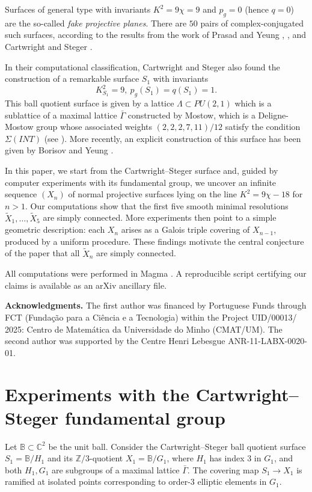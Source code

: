 \documentclass[10pt,a4paper]{article}
\newcommand{\ZZ}{\mathbb{Z}}
\newcommand{\BB}{\mathbb{B}}
\newcommand{\CC}{\mathbb{C}}
\begin{document}
Surfaces of general type with invariants $K^2=9\chi=9$ and $p_g=0$ (hence $q=0$) are the so-called {\em fake projective planes}.
There are $50$ pairs of complex-conjugated such surfaces,
according to the results from the work of Prasad and Yeung \cite{PY1}, \cite{PY2},
and Cartwright and Steger \cite{CS}.

In their computational classification, Cartwright and Steger \cite{CS} also found the construction of a remarkable surface
$S_1$ with invariants
\[K_{S_1}^2=9,\ p_{g}(S_1)=q(S_1)=1.\]
%
This ball quotient surface is given by a lattice $\Lambda\subset PU(2,1)$ which is a sublattice of a maximal lattice
$\bar{\Gamma}$ constructed by Mostow, which is a Deligne-Mostow group whose associated
weights $(2,2,2,7,11)/12$ satisfy the condition $\Sigma(INT)$ (see \cite{Mostow}).
%
More recently, an explicit construction of this surface has been given by Borisov and Yeung \cite{BY}.

In this paper, we start from the Cartwright--Steger surface and,
guided by computer experiments with its fundamental group,
we uncover an infinite sequence $(X_n)$ of normal projective surfaces
lying on the line $K^2 = 9\chi - 18$ for $n > 1$.
Our computations show that the first five smooth minimal resolutions
\(\widetilde{X}_1,\dots,\widetilde{X}_5\) are simply connected. More
experiments then point to a simple geometric description: each
\(X_n\) arises as a Galois triple covering of \(X_{n-1}\), produced by a uniform procedure.
These findings motivate the central conjecture of the paper that all \(\widetilde{X}_n\) are simply
connected.

All computations were performed in Magma \cite{BCP}.
A reproducible script certifying our claims is available as an arXiv ancillary file.





\bigskip 
\noindent\textbf{Acknowledgments.}
The first author was financed by Portuguese Funds through FCT
(Funda\c c\~ao para a Ci\^encia e a Tecnologia) within the Project
UID/00013/ 2025: Centro de Matem\'atica da Universidade do Minho (CMAT/UM).
The second author was supported by the Centre Henri Lebesgue ANR-11-LABX-0020-01.


\section{Experiments with the Cartwright--Steger fundamental group}

Let \(\BB\subset\CC^2\) be the unit ball. Consider the
Cartwright--Steger ball quotient surface \(S_1=\BB/H_1\) and its $\ZZ/3$-quotient
\(X_1=\BB/G_1\), where \(H_1\) has index \(3\) in \(G_1\), and both
$H_1,G_1$ are subgroups of a maximal lattice $\bar\Gamma$.
The covering map \(S_1\to X_1\) is ramified at isolated points corresponding to
order-\(3\) elliptic elements in \(G_1\).
\end{document}

